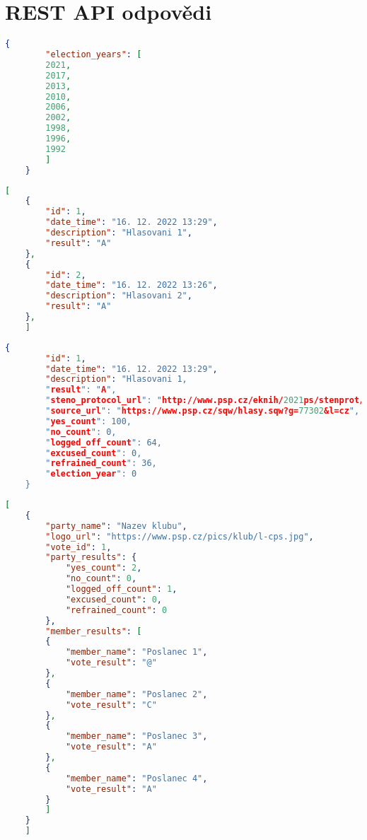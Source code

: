 \chapter{REST API odpovědi}


\begin{lstlisting}[caption={Tělo odpovědi pro dotaz \lstinline{GET /api/app}.}, label={fig:app}, language=json,firstnumber=1,tabsize=2]
	{
		"election_years": [
		2021,
		2017,
		2013,
		2010,
		2006,
		2002,
		1998,
		1996,
		1992
		]
	}
\end{lstlisting}

\begin{lstlisting}[caption={Tělo odpovědi pro dotaz \lstinline{GET /api/vote}}, label={fig:vote}, language=json,firstnumber=1,tabsize=2]
	[
	{
		"id": 1,
		"date_time": "16. 12. 2022 13:29",
		"description": "Hlasovani 1",
		"result": "A"
	},
	{
		"id": 2,
		"date_time": "16. 12. 2022 13:26",
		"description": "Hlasovani 2",
		"result": "A"
	},
	]
\end{lstlisting}

\begin{lstlisting}[caption={Tělo odpovědi pro dotaz \lstinline{GET /api/vote/{id}}}, label={fig:vote-1}, language=json,firstnumber=1,tabsize=2]
	{
		"id": 1,
		"date_time": "16. 12. 2022 13:29",
		"description": "Hlasovani 1,
		"result": "A",
		"steno_protocol_url": "http://www.psp.cz/eknih/2021ps/stenprot/048schuz",
		"source_url": "https://www.psp.cz/sqw/hlasy.sqw?g=77302&l=cz",
		"yes_count": 100,
		"no_count": 0,
		"logged_off_count": 64,
		"excused_count": 0,
		"refrained_count": 36,
		"election_year": 0
	}
\end{lstlisting}

\newpage

\begin{lstlisting}[caption={Tělo odpovědi pro dotaz \lstinline{GET /api/party/vote/1}}, label={fig:party-vote-1}, language=json,firstnumber=1,tabsize=2]
	[
	{
		"party_name": "Nazev klubu",
		"logo_url": "https://www.psp.cz/pics/klub/l-cps.jpg",
		"vote_id": 1,
		"party_results": {
			"yes_count": 2,
			"no_count": 0,
			"logged_off_count": 1,
			"excused_count": 0,
			"refrained_count": 0
		},
		"member_results": [
		{
			"member_name": "Poslanec 1",
			"vote_result": "@"
		},
		{
			"member_name": "Poslanec 2",
			"vote_result": "C"
		},
		{
			"member_name": "Poslanec 3",
			"vote_result": "A"
		},
		{
			"member_name": "Poslanec 4",
			"vote_result": "A"
		}
		]
	}
	]
\end{lstlisting}

